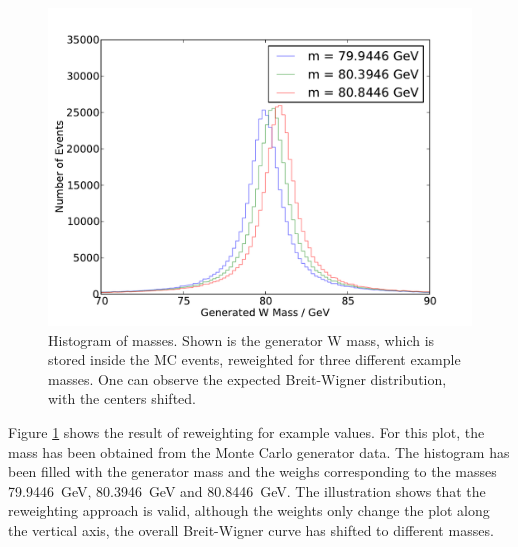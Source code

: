 \documentclass[
	paper=A4,
	parskip=full,
	chapterprefix=true,
	11pt,
	headings=normal,
	bibliography=totoc,
	listof=totoc,
	titlepage=on,
]{scrreprt}
\begin{document}
\begin{figure}
	\centering
	\includegraphics{mc_examples}
	\caption{Histogram of \PW masses. Shown is the generator W mass, which is stored inside the MC events, reweighted for three different example masses. One can observe the expected Breit-Wigner distribution, with the centers shifted.}
	\label{fig:mc_examples}
\end{figure}

Figure \ref{fig:mc_examples} shows the result of reweighting for example values. For this plot, the  \PW mass has been obtained from the Monte Carlo generator data. The histogram has been filled with the generator mass and the weighs corresponding to the \PW masses \SI{79.9446}{\giga\electronvolt}, \SI{80.3946}{\giga\electronvolt} and \SI{80.8446}{\giga\electronvolt}. The illustration shows that the reweighting approach is valid, although the weights only change the plot along the vertical axis, the overall Breit-Wigner curve has shifted to different masses.
\end{document}
